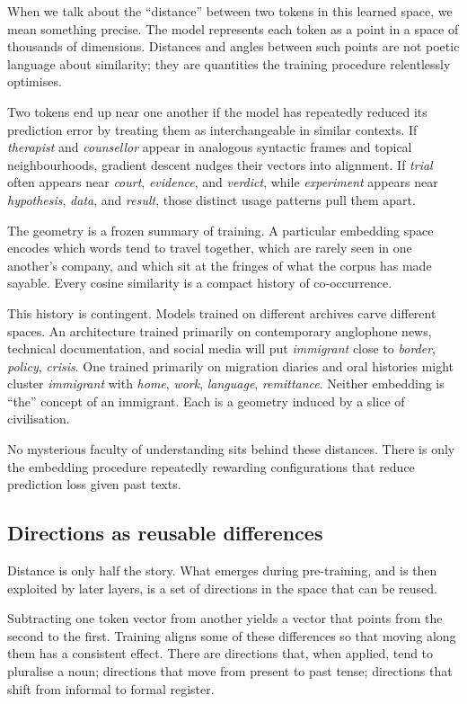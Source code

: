\documentclass[12pt,a4paper]{article}
\begin{document}
When we talk about the ``distance'' between two tokens in this learned space, we mean something precise. The model represents each token as a point in a space of thousands of dimensions. Distances and angles between such points are not poetic language about similarity; they are quantities the training procedure relentlessly optimises.

Two tokens end up near one another if the model has repeatedly reduced its prediction error by treating them as interchangeable in similar contexts. If \emph{therapist} and \emph{counsellor} appear in analogous syntactic frames and topical neighbourhoods, gradient descent nudges their vectors into alignment. If \emph{trial} often appears near \emph{court}, \emph{evidence}, and \emph{verdict}, while \emph{experiment} appears near \emph{hypothesis}, \emph{data}, and \emph{result}, those distinct usage patterns pull them apart.

The geometry is a frozen summary of training. A particular embedding space encodes which words tend to travel together, which are rarely seen in one another's company, and which sit at the fringes of what the corpus has made sayable. Every cosine similarity is a compact history of co-occurrence.

This history is contingent. Models trained on different archives carve different spaces. An architecture trained primarily on contemporary anglophone news, technical documentation, and social media will put \emph{immigrant} close to \emph{border}, \emph{policy}, \emph{crisis}. One trained primarily on migration diaries and oral histories might cluster \emph{immigrant} with \emph{home}, \emph{work}, \emph{language}, \emph{remittance}. Neither embedding is ``the'' concept of an immigrant. Each is a geometry induced by a slice of civilisation.

No mysterious faculty of understanding sits behind these distances. There is only the embedding procedure repeatedly rewarding configurations that reduce prediction loss given past texts.

\subsection*{Directions as reusable differences}

Distance is only half the story. What emerges during pre-training, and is then exploited by later layers, is a set of directions in the space that can be reused.

Subtracting one token vector from another yields a vector that points from the second to the first. Training aligns some of these differences so that moving along them has a consistent effect. There are directions that, when applied, tend to pluralise a noun; directions that move from present to past tense; directions that shift from informal to formal register.
\end{document}
